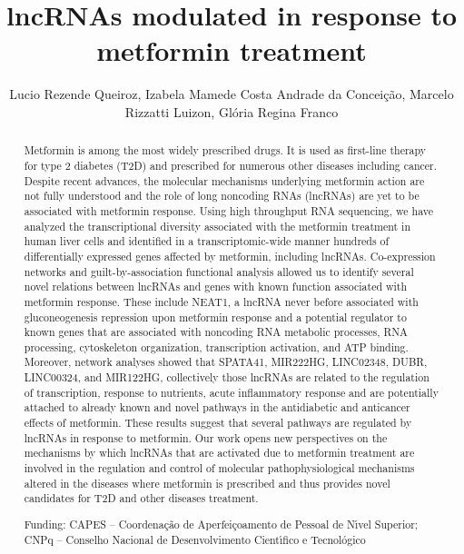\documentclass[twoside]{article}
\title{\vspace{-15mm}\fontsize{24pt}{10pt}\selectfont\textbf{ lncRNAs modulated in response to metformin treatment }} %
\author{ Lucio Rezende Queiroz, Izabela Mamede Costa Andrade da Concei\c{c}\~ao, Marcelo Rizzatti Luizon, Gl\'oria Regina Franco }
\affil{ Universidade Federal de Minas Gerais }
\date{}
\begin{document}
  
  
  \maketitle %
  
  
  \thispagestyle{fancy} %
  
  
  \begin{abstract}
  Metformin is among the most widely prescribed drugs. It is used as first-line therapy for type 2 diabetes (T2D) and prescribed for numerous other diseases including cancer. Despite recent advances,  the molecular mechanisms underlying metformin action are not fully understood and the role of long noncoding RNAs (lncRNAs) are yet to be associated with metformin response. Using high throughput RNA sequencing,  we have analyzed the transcriptional diversity associated with the metformin treatment in human liver cells and identified in a transcriptomic-wide manner hundreds of differentially expressed genes affected by metformin,  including lncRNAs. Co-expression networks and guilt-by-association functional analysis allowed us to identify several novel relations between lncRNAs and genes with known function associated with metformin response.  These include NEAT1,  a lncRNA never before associated with gluconeogenesis repression upon metformin response and a potential regulator to known genes that are associated with noncoding RNA metabolic processes,  RNA processing,  cytoskeleton organization,  transcription activation,  and ATP binding. Moreover,  network analyses showed that SPATA41,  MIR222HG,  LINC02348,  DUBR,  LINC00324,  and MIR122HG,  collectively those lncRNAs are related to the regulation of transcription,  response to nutrients,  acute inflammatory response and are potentially attached to already known and novel pathways in the antidiabetic and anticancer effects of metformin.  These results suggest that several pathways are regulated by lncRNAs in response to metformin. Our work opens new perspectives on the mechanisms by which lncRNAs that are activated due to metformin treatment are involved in the regulation and control of molecular pathophysiological mechanisms altered in the diseases where metformin is prescribed and thus provides novel candidates for T2D and other diseases treatment.
  
  Funding: CAPES – Coordena\c{c}\~ao de Aperfei\c{c}oamento de Pessoal de N\'{\i}vel Superior; CNPq – Conselho Nacional de Desenvolvimento Cient\'{\i}fico e Tecnol\'ogico \\ 
  \end{abstract}
  
\end{document}
